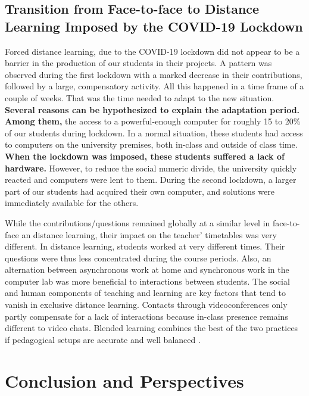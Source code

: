 \documentclass{aims}
\theoremstyle{definition}
\begin{document}
\hypertarget{transition-from-face-to-face-to-distance-learning-imposed-by-the-covid-19-lockdown-2}{%
\subsection{Transition from Face-to-face to Distance Learning Imposed by
the COVID-19
Lockdown}\label{transition-from-face-to-face-to-distance-learning-imposed-by-the-covid-19-lockdown-2}}

Forced distance learning, due to the COVID-19 lockdown did not appear to
be a barrier in the production of our students in their projects. A
pattern was observed during the first lockdown with a marked decrease in
their contributions, followed by a large, compensatory activity. All
this happened in a time frame of a couple of weeks. That was the time
needed to adapt to the new situation. \textbf{Several reasons can be
hypothesized to explain the adaptation period. Among them,} the access
to a powerful-enough computer for roughly 15 to 20\% of our students
during lockdown. In a normal situation, these students had access to
computers on the university premises, both in-class and outside of class
time. \textbf{When the lockdown was imposed, these students suffered a
lack of hardware.} However, to reduce the social numeric divide, the
university quickly reacted and computers were lent to them. During the
second lockdown, a larger part of our students had acquired their own
computer, and solutions were immediately available for the others.

While the contributions/questions remained globally at a similar level
in face-to-face an distance learning, their impact on the teacher'
timetables was very different. In distance learning, students worked at
very different times. Their questions were thus less concentrated during
the course periods. Also, an alternation between asynchronous work at
home and synchronous work in the computer lab was more beneficial to
interactions between students. The social and human components of
teaching and learning are key factors that tend to vanish in exclusive
distance learning. Contacts through videoconferences only partly
compensate for a lack of interactions because in-class presence remains
different to video chats. Blended learning combines the best of the two
practices if pedagogical setups are accurate and well balanced
\cite{Bernard2014}.

\hypertarget{conclusion-and-perspectives}{%
\section{Conclusion and
Perspectives}\label{conclusion-and-perspectives}}
\end{document}
